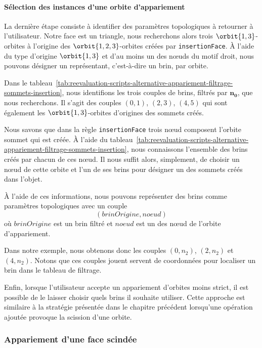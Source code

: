 \paragraph{Sélection des instances d'une orbite d'appariement}



La dernière étape consiste à identifier des paramètres topologiques à retourner
à l'utilisateur. %
Notre face est un triangle, nous recherchons alors trois \(\orbit{1,3}\)-orbites
à l'origine des \(\orbit{1,2,3}\)-orbites créées par \texttt{insertion\-Face}. %
À l'aide du type d'origine \(\orbit{1,3}\) et d'au moins un des n\oe uds du
motif droit, nous pouvons désigner un représentant, c'est-à-dire un brin, par
orbite. %

Dans le
tableau~\ref{tab:reevaluation-scripts-alternative-appariement-filtrage-sommets-insertion},
nous identifions les trois couples de brins, filtrés par \(\mathbf{n_{0}}\), que
nous recherchons. %
Il s'agit des couples \((0,1)\), \((2,3)\), \((4,5)\) qui sont également les
\(\orbit{1,3}\)-orbites d'origines des sommets créés. %

Nous savons que dans la règle \texttt{insertionFace} trois n\oe ud composent
l'orbite sommet qui est créée. %
À l'aide du
tableau~\ref{tab:reevaluation-scripts-alternative-appariement-filtrage-sommets-insertion},
nous connaissons l'ensemble des brins créés par chacun de ces n\oe ud. %
Il nous suffit alors, simplement, de choisir un n\oe ud de cette orbite et l'un
de ses brins pour désigner un des sommets créés dans l'objet. %

À l'aide de ces informations, nous pouvons représenter des brins comme
paramètres topologiques avec un couple %
\[(\mathit{brinOrigine},\mathit{noeud})\]%
où \(\mathit{brinOrigine}\) est un brin filtré et \(\mathit{noeud}\) est un des
n\oe ud de l'orbite d'appariement. %

Dans notre exemple, nous obtenons donc les couples \((0, n_{2})\),
\((2, n_{2})\) et \((4, n_{2})\). %
Notons que ces couples jouent servent de coordonnées pour localiser un brin dans
le tableau de filtrage. %

Enfin, lorsque l'utilisateur accepte un appariement d'orbites moins strict, il
est possible de le laisser choisir quels brins il souhaite utiliser. %
Cette approche est similaire à la stratégie présentée dans le chapitre précédent
lorsqu'une opération ajoutée provoque la scission d'une orbite. %

\subsubsection{Appariement d'une face scindée}
\label{sec:reevaluation-scripts-alternative-appariement-scission-face}


